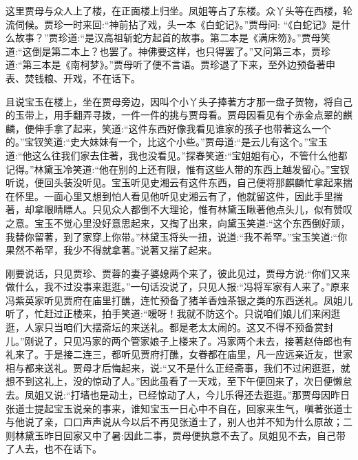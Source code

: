\begin{parag}
    这里贾母与众人上了楼，在正面楼上归坐。凤姐等占了东楼。众丫头等在西楼，轮流伺候。贾珍一时来回:“神前拈了戏，头一本《白蛇记》。”贾母问: “《白蛇记》是什么故事？”贾珍道:“是汉高祖斩蛇方起首的故事。第二本是《满床笏》。”贾母笑道:“这倒是第二本上？也罢了。神佛要这样，也只得罢了。”又问第三本，贾珍道:“第三本是《南柯梦》。”贾母听了便不言语。贾珍退了下来，至外边预备著申表、焚钱粮、开戏，不在话下。
\end{parag}


\begin{parag}
    且说宝玉在楼上，坐在贾母旁边，因叫个小丫头子捧著方才那一盘子贺物，将自己的玉带上，用手翻弄寻拨，一件一件的挑与贾母看。贾母因看见有个赤金点翠的麒麟，便伸手拿了起来，笑道:“这件东西好像我看见谁家的孩子也带著这么一个的。”宝钗笑道:“史大妹妹有一个，比这个小些。”贾母道:“是云儿有这个。”宝玉道:“他这么往我们家去住著，我也没看见。”探春笑道:“宝姐姐有心，不管什么他都记得。”林黛玉冷笑道:“他在别的上还有限，惟有这些人带的东西上越发留心。”宝钗听说，便回头装没听见。宝玉听见史湘云有这件东西，自己便将那麒麟忙拿起来揣在怀里。一面心里又想到怕人看见他听见史湘云有了，他就留这件，因此手里揣著，却拿眼睛瞟人。只见众人都倒不大理论，惟有林黛玉瞅著他点头儿，似有赞叹之意。宝玉不觉心里没好意思起来，又掏了出来，向黛玉笑道:“这个东西倒好顽，我替你留著，到了家穿上你带。”林黛玉将头一扭，说道:“我不希罕。”宝玉笑道:“你果然不希罕，我少不得就拿著。”说著又揣了起来。
\end{parag}


\begin{parag}
    刚要说话，只见贾珍、贾蓉的妻子婆媳两个来了，彼此见过，贾母方说:“你们又来做什么，我不过没事来逛逛。”一句话没说了，只见人报:“冯将军家有人来了。”原来冯紫英家听见贾府在庙里打醮，连忙预备了猪羊香烛茶银之类的东西送礼。凤姐儿听了，忙赶过正楼来，拍手笑道:“嗳呀！我就不防这个。只说咱们娘儿们来闲逛逛，人家只当咱们大摆斋坛的来送礼。都是老太太闹的。这又不得不预备赏封儿。”刚说了，只见冯家的两个管家娘子上楼来了。冯家两个未去，接著赵侍郎也有礼来了。于是接二连三，都听见贾府打醮，女眷都在庙里，凡一应远亲近友，世家相与都来送礼。贾母才后悔起来，说:“又不是什么正经斋事，我们不过闲逛逛，就想不到这礼上，没的惊动了人。”因此虽看了一天戏，至下午便回来了，次日便懒怠去。凤姐又说:“打墙也是动土，已经惊动了人，今儿乐得还去逛逛。”那贾母因昨日张道士提起宝玉说亲的事来，谁知宝玉一日心中不自在，回家来生气，嗔著张道士与他说了亲，口口声声说从今以后不再见张道士了，别人也并不知为什么原故；二则林黛玉昨日回家又中了暑:因此二事，贾母便执意不去了。凤姐见不去，自己带了人去，也不在话下。
\end{parag}


